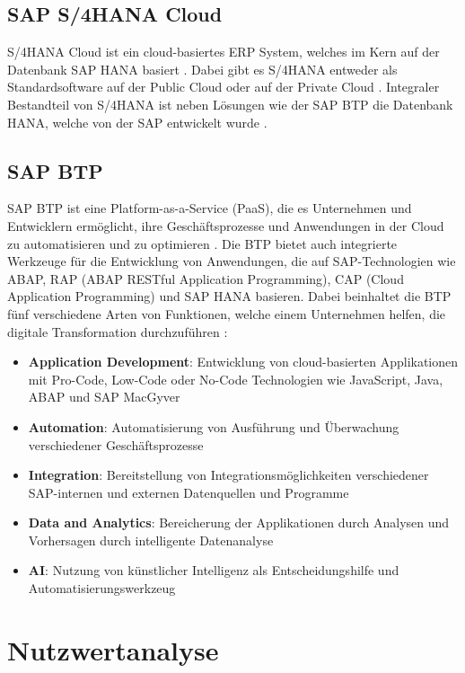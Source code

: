 \subsection{SAP S/4HANA Cloud}
S/4HANA Cloud ist ein cloud-basiertes \ac{ERP} System, welches im Kern auf der Datenbank SAP HANA basiert \cite[S. 6]{sap_btp100_2022}. Dabei gibt es S/4HANA entweder als Standardsoftware auf der Public Cloud oder auf der Private Cloud \cite{sap_sap_nodate-3} \cite[S. 12 f.]{sap_btp100_2022}. Integraler Bestandteil von S/4HANA ist neben Lösungen wie der SAP BTP die Datenbank HANA, welche von der SAP entwickelt wurde \cite[S. 7]{sap_btp100_2022}.

\subsection{SAP BTP}
SAP \ac{BTP} ist eine Platform-as-a-Service (PaaS), die es Unternehmen und Entwicklern ermöglicht, ihre Geschäftsprozesse und Anwendungen in der Cloud zu automatisieren und zu optimieren \cite[S. 13 f.]{sap_btp100_2022}. Die \ac{BTP} bietet auch integrierte Werkzeuge für die Entwicklung von Anwendungen, die auf SAP-Technologien wie ABAP, RAP (ABAP RESTful Application Programming), CAP (Cloud Application Programming) und SAP HANA basieren. Dabei beinhaltet die \ac{BTP} fünf verschiedene Arten von Funktionen, welche einem Unternehmen helfen, die digitale Transformation durchzuführen \cite[S. 39]{sap_btp100_2022} \cite{sap_sap_nodate-1}:
\begin{itemize}
    \item \textbf{Application Development}: Entwicklung von cloud-basierten Applikationen mit Pro-Code, Low-Code oder No-Code Technologien wie JavaScript, Java, ABAP und SAP MacGyver
    \item \textbf{Automation}: Automatisierung von Ausführung und Überwachung verschiedener Geschäftsprozesse
    \item \textbf{Integration}: Bereitstellung von Integrationsmöglichkeiten verschiedener SAP-internen und externen Datenquellen und Programme
    \item \textbf{Data and Analytics}: Bereicherung der Applikationen durch Analysen und Vorhersagen durch intelligente Datenanalyse
    \item \textbf{AI}: Nutzung von künstlicher Intelligenz als Entscheidungshilfe und Automatisierungswerkzeug
\end{itemize}

\section{Nutzwertanalyse}

